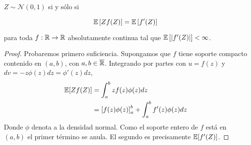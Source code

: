 \documentclass[main.tex]{subfiles}
\begin{document}
\begin{theorem}
    $Z \sim \mathcal{N}(0, 1)$ si y sólo si 

    \begin{equation*}
        \operatorname{\mathbb{E}}\left[Zf(Z)\right] = \operatorname{\mathbb{E}}\left[f'(Z)\right]
    \end{equation*}
    
    para toda $f: \operatorname{\mathbb{R}} \to \operatorname{\mathbb{R}}$ absolutamente continua tal que $\operatorname{\mathbb{E}} \left[| f'(Z) |\right] < \infty$.
    \begin{proof} 
        Probaremos primero suficiencia.
        Supongamos que $f$ tiene soporte compacto contenido en $(a, b)$, con $a, b \in \overline{\operatorname{\mathbb{R}}}$. Integrando por partes con $u=f(z)$ y $dv = -z\phi(z)dz = \phi'(z)dz$,
        \begin{align}\label{eq:stein-parts}
        \begin{split}
            \operatorname{\mathbb{E}}[Zf(Z)] &= \int_a^b zf(z)\phi(z)dz \\
                &= \left[f(z)\phi(z) \right]_a^b 
                    + \int_a^b f'(z)\phi(z)dz
        \end{split}
        \end{align}
        Donde $\phi$ denota a la densidad normal. Como el soporte entero de $f$ está en $(a, b)$ el primer término se anula. El segundo es precisamente $\operatorname{\mathbb{E}}[f'(Z)]$. 


\end{proof}
\end{theorem}
\end{document}
